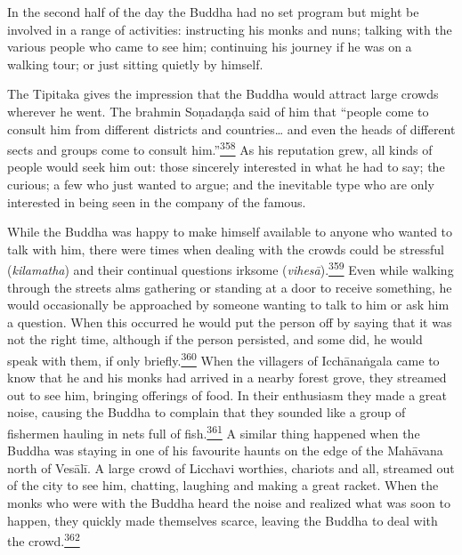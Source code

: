In the second half of the day the Buddha had no set program but might be
involved in a range of activities: instructing his monks and nuns;
talking with the various people who came to see him; continuing his
journey if he was on a walking tour; or just sitting quietly by himself.

The Tipitaka gives the impression that the Buddha would attract large
crowds wherever he went. The brahmin Soṇadaṇḍa said of him that ``people
come to consult him from different districts and countries\ldots{} and
even the heads of different sects and groups come to consult
him.''\label{footprints_split_011.html_fnref358}\hyperref[footprints_split_024.htmlux5cux23fn358]{\textsuperscript{358}}
As his reputation grew, all kinds of people would seek him out: those
sincerely interested in what he had to say; the curious; a few who just
wanted to argue; and the inevitable type who are only interested in
being seen in the company of the famous.

While the Buddha was happy to make himself available to anyone who
wanted to talk with him, there were times when dealing with the crowds
could be stressful (\emph{kilamatha}) and their continual questions
irksome
(\emph{vihesā}).\label{footprints_split_011.html_fnref359}\hyperref[footprints_split_024.htmlux5cux23fn359]{\textsuperscript{359}}
Even while walking through the streets alms gathering or standing at a
door to receive something, he would occasionally be approached by
someone wanting to talk to him or ask him a question. When this occurred
he would put the person off by saying that it was not the right time,
although if the person persisted, and some did, he would speak with
them, if only
briefly.\label{footprints_split_011.html_fnref360}\hyperref[footprints_split_024.htmlux5cux23fn360]{\textsuperscript{360}}
When the villagers of Icchānaṅgala came to know that he and his monks
had arrived in a nearby forest grove, they streamed out to see him,
bringing offerings of food. In their enthusiasm they made a great noise,
causing the Buddha to complain that they sounded like a group of
fishermen hauling in nets full of
fish.\label{footprints_split_011.html_fnref361}\hyperref[footprints_split_024.htmlux5cux23fn361]{\textsuperscript{361}}
A similar thing happened when the Buddha was staying in one of his
favourite haunts on the edge of the Mahāvana north of Vesālī. A large
crowd of Licchavi worthies, chariots and all, streamed out of the city
to see him, chatting, laughing and making a great racket. When the monks
who were with the Buddha heard the noise and realized what was soon to
happen, they quickly made themselves scarce, leaving the Buddha to deal
with the
crowd.\label{footprints_split_011.html_fnref362}\hyperref[footprints_split_024.htmlux5cux23fn362]{\textsuperscript{362}}

